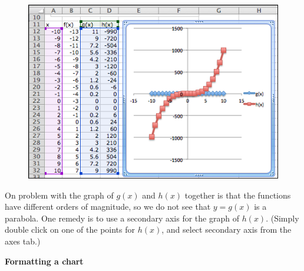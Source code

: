 \documentclass[10pt,]{book}
\newcommand{\terminology}[1]{\textbf{#1}}
\theoremstyle{plain}
\theoremstyle{definition}
\theoremstyle{definition}
\begin{document}
\leavevmode%
\begin{figure}
\centering
\includegraphics[width=0.8\linewidth]{images/sec1-4-11.png}
\end{figure}
\par
On problem with the graph of \(g(x)\) and \(h(x)\) together is that the functions have different orders of magnitude, so we do not see that \(y = g(x)\) is a parabola.  One remedy is to use a secondary axis for the graph of \(h(x)\).  (Simply double click on one of the points for \(h(x)\), and select secondary axis from the axes tab.)%
\par
\terminology{Formatting a chart}%
\par
\end{document}
